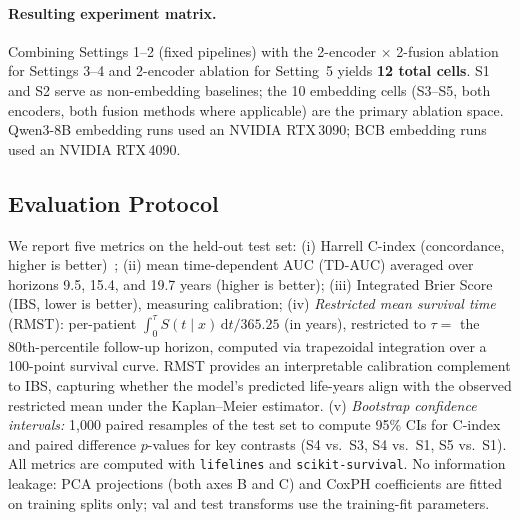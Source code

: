 \paragraph{Resulting experiment matrix.}
Combining Settings 1--2 (fixed pipelines) with the 2-encoder $\times$
2-fusion ablation for Settings 3--4 and 2-encoder ablation for Setting~5
yields \textbf{12 total cells}.
S1 and S2 serve as non-embedding baselines; the 10 embedding cells
(S3--S5, both encoders, both fusion methods where applicable)
are the primary ablation space.
Qwen3-8B embedding runs used an NVIDIA RTX\,3090; BCB embedding runs used
an NVIDIA RTX\,4090.

\subsection{Evaluation Protocol}
We report five metrics on the held-out test set:
(i) Harrell C-index (concordance, higher is better)~\cite{harrellcindex};
(ii) mean time-dependent AUC (TD-AUC) averaged over horizons
    9.5, 15.4, and 19.7 years (higher is better);
(iii) Integrated Brier Score (IBS, lower is better), measuring calibration;
(iv) \emph{Restricted mean survival time} (RMST): per-patient
    $\int_0^\tau S(t\mid x)\,\mathrm{d}t / 365.25$ (in years), restricted
    to $\tau = $ the 80th-percentile follow-up horizon, computed via
    trapezoidal integration over a 100-point survival curve.
    RMST provides an interpretable calibration complement to IBS,
    capturing whether the model's predicted life-years align with
    the observed restricted mean under the Kaplan--Meier estimator.
(v) \emph{Bootstrap confidence intervals:} 1{,}000 paired resamples of the test set to compute 95\% CIs for C-index and paired difference $p$-values for key contrasts (S4 vs.\ S3, S4 vs.\ S1, S5 vs.\ S1).
All metrics are computed with \texttt{lifelines} and \texttt{scikit-survival}.
No information leakage: PCA projections (both axes B and C) and CoxPH
coefficients are fitted on training splits only; val and test transforms
use the training-fit parameters.

